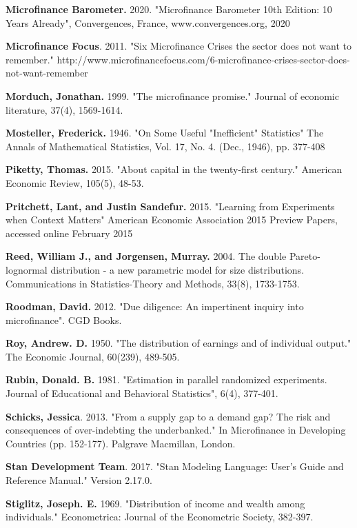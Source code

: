 \documentclass[AER]{AEA}
\begin{document}
\begin{thebibliography}{99}
 \textbf{ Microfinance Barometer.} 2020. "Microfinance Barometer 10th Edition: 10 Years Already", Convergences, France, www.convergences.org, 2020

 \textbf{ Microfinance Focus}. 2011. "Six Microfinance Crises the sector does not want to remember." http://www.microfinancefocus.com/6-microfinance-crises-sector-does-not-want-remember

 \textbf{ Morduch, Jonathan.} 1999. "The microfinance promise." Journal of economic literature, 37(4), 1569-1614.

 \textbf{ Mosteller, Frederick.} 1946. "On Some Useful "Inefficient" Statistics" The Annals of Mathematical Statistics, Vol. 17, No. 4. (Dec., 1946), pp. 377-408

 \textbf{ Piketty, Thomas.} 2015. "About capital in the twenty-first century." American Economic Review, 105(5), 48-53.

 \textbf{ Pritchett, Lant, and Justin Sandefur.} 2015. "Learning from Experiments when Context Matters"  American Economic Association 2015 Preview Papers, accessed online February 2015

 \textbf{ Reed, William J., and Jorgensen, Murray.} 2004. The double Pareto-lognormal distribution - a new parametric model for size distributions. Communications in Statistics-Theory and Methods, 33(8), 1733-1753.

 \textbf{ Roodman, David.} 2012. "Due diligence: An impertinent inquiry into microfinance". CGD Books.

 \textbf{ Roy, Andrew. D.} 1950. "The distribution of earnings and of individual output." The Economic Journal, 60(239), 489-505.

 \textbf{ Rubin, Donald. B.} 1981. "Estimation in parallel randomized experiments. Journal of Educational and Behavioral Statistics", 6(4), 377-401.

 \textbf{ Schicks, Jessica}. 2013. "From a supply gap to a demand gap? The risk and consequences of over-indebting the underbanked." In Microfinance in Developing Countries (pp. 152-177). Palgrave Macmillan, London.

 \textbf{ Stan Development Team}. 2017. "Stan Modeling Language: User's Guide and Reference Manual." Version 2.17.0.

 \textbf{ Stiglitz, Joseph. E.} 1969. "Distribution of income and wealth among individuals." Econometrica: Journal of the Econometric Society, 382-397.


\end{thebibliography}
\end{document}
